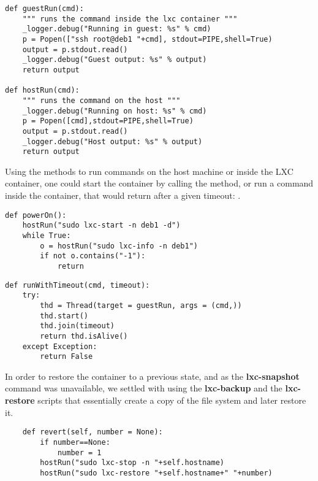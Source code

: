 \lstset{caption=Running Commands,language=python,label=lst:lxc-commands}
\begin{lstlisting}
def guestRun(cmd):
    """ runs the command inside the lxc container """
    _logger.debug("Running in guest: %s" % cmd)
    p = Popen(["ssh root@deb1 "+cmd], stdout=PIPE,shell=True)
    output = p.stdout.read()
    _logger.debug("Guest output: %s" % output)
    return output

def hostRun(cmd):
    """ runs the command on the host """
    _logger.debug("Running on host: %s" % cmd)
    p = Popen([cmd],stdout=PIPE,shell=True)
    output = p.stdout.read()
    _logger.debug("Host output: %s" % output)
    return output
\end{lstlisting}

Using the methods to run commands on the host machine or inside the 
LXC container, one could start the container by calling the 
 method, or run a command inside the container,
that would return after a given timeout: .

\lstset{caption=Method Called to Power on the Container,language=python,label=lst:lxc-poweron}
\begin{lstlisting}
def powerOn():
    hostRun("sudo lxc-start -n deb1 -d")
    while True:
        o = hostRun("sudo lxc-info -n deb1")
        if not o.contains("-1"):
            return
\end{lstlisting}


\lstset{caption=Method That Runs a Command Inside the Container,language=python,label=lst:lxc-runtimeout}
\begin{lstlisting}
def runWithTimeout(cmd, timeout):
    try:
        thd = Thread(target = guestRun, args = (cmd,))
        thd.start()
        thd.join(timeout)
        return thd.isAlive()
    except Exception:
        return False
\end{lstlisting}


In order to restore the container to a previous state, and as the {\bf lxc-snapshot} 
command was unavailable, we settled with using the \textbf{lxc-backup} and 
the \textbf{lxc-restore} scripts that essentially create a
copy of the file system and later restore it.

\lstset{caption=Restoring the Container to a Previous State, language=python, label=lst:lxc-revert}
\begin{lstlisting}
    def revert(self, number = None):
        if number==None:
            number = 1
        hostRun("sudo lxc-stop -n "+self.hostname)
        hostRun("sudo lxc-restore "+self.hostname+" "+number)
\end{lstlisting}

